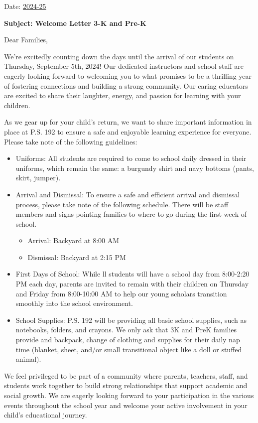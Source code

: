 \documentclass[12pt,letterpaper]{article}
\begin{document}
\vspace*{0.5in}
Date: \href{https://www.ps192.org}{2024-25} 

\textbf{Subject: Welcome Letter 3-K and Pre-K}

Dear Families,

We're excitedly counting down the days until the arrival of our students on Thursday, September 5th, 2024! Our dedicated instructors and school staff are eagerly looking
forward to welcoming you to what promises to be a thrilling year of fostering connections
and building a strong community. Our caring educators are excited to share their laughter,
energy, and passion for learning with your children.

As we gear up for your child's return, we want to share important information in place at
P.S. 192 to ensure a safe and enjoyable learning experience for everyone. Please take note
of the following guidelines:
	\begin{itemize}
	\item Uniforms: All students are required to come to school daily dressed in their
	uniforms, which remain the same: a burgundy shirt and navy bottoms (pants, skirt,
	jumper).
	\item Arrival and Dismissal: To ensure a safe and efficient arrival and dismissal 
	process, please take note of the following schedule. There will be staff members and
	signs pointing families to where to go during the first week of school.
		\begin{itemize}
		\item Arrival: Backyard at 8:00 AM
		\item Dismissal: Backyard at 2:15 PM
		\end{itemize}
	\item First Days of School: While ll students will have a school day from 8:00-2:20 PM
	each day, parents are invited to remain with their children on Thursday and Friday from
	8:00-10:00 AM to help our young scholars transition smoothly into the school
	environment.
	\item School Supplies: P.S. 192 will be providing all basic school supplies, such as
	notebooks, folders, and crayons. We only ask that 3K and PreK families provide and
	backpack, change of clothing and supplies for their daily nap time $($blanket, sheet,
	and/or small transitional object like a doll or stuffed animal$)$.
	\end{itemize}

We feel privileged to be part of a community where parents, teachers, staff, and students
work together to build strong relationships that support academic and social growth. We
are eagerly looking forward to your participation in the various events throughout the
school year and welcome your active involvement in your child's educational journey.
\end{document}
